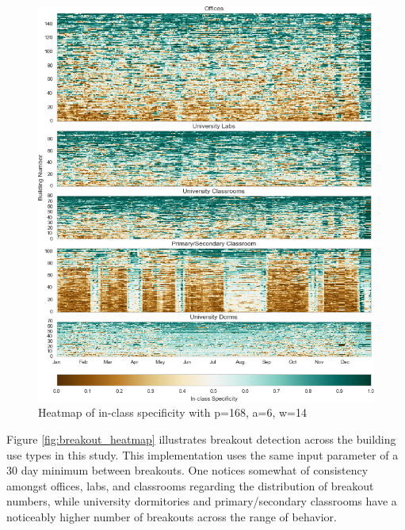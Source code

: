 \begin{figure}[ht!]
\begin{center}
\includegraphics[width=1\columnwidth]{figures/jmotif_inclassspec_allbuildings_heatmap_168_6_14/jmotif_inclassspec_allbuildings_heatmap_168_6_14}
\caption{Heatmap of in-class specificity with p=168, a=6, w=14
\label{fig:weeklyspecificity_all}%
}
\end{center}
\end{figure}


Figure \ref{fig:breakout_heatmap} illustrates breakout detection across the building use types in this study. This implementation uses the same input parameter of a 30 day minimum between breakouts. One notices somewhat of consistency amongst offices, labs, and classrooms regarding the distribution of breakout numbers, while university dormitories and primary/secondary classrooms have a noticeably higher number of breakouts across the range of behavior.

